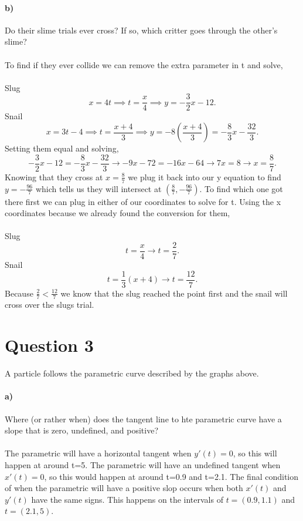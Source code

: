 \documentclass{report}
\begin{document}
\paragraph{b)} Do their slime trials ever cross? If so, which critter goes through the other's slime? \\ \\
To find if they ever collide we can remove the extra parameter in t and solve, \\ \\
Slug
\[
x=4t \implies t= \frac{ x }{ 4 } \implies y=-\frac{ 3 }{ 2 } x-12
.\] 
Snail
\[
x=3t-4 \implies t= \frac{ x+4 }{ 3 } \implies y=-8\left( \frac{ x+4 }{ 3 }  \right) =-\frac{ 8 }{ 3 } x-\frac{ 32 }{ 3 }
.\] 
Setting them equal and solving,
\[
-\frac{ 3 }{ 2 } x-12 = -\frac{ 8 }{ 3 } x-\frac{ 32 }{ 3 } \to -9x -72 =-16x-64 \to 7x=8 \to x=\frac{ 8 }{ 7 } 
.\] 
Knowing that they cross at $ x=\frac{ 8 }{ 7 }  $ we plug it back into our y equation to find $ y=-\frac{ 96 }{ 7 }  $ which tells us they will intersect at $ \left( \frac{ 8 }{ 7 } ,-\frac{ 96 }{ 7 }  \right)  $. To find which one got there first we can plug in either of our coordinates to solve for t. Using the x coordinates because we already found the conversion for them, \\ \\
Slug
\[
t=\frac{ x }{ 4 } \to t=\frac{ 2 }{ 7 } 
.\] 
Snail
\[
t=\frac{ 1 }{ 3 } \left( x+4 \right) \to t=\frac{ 12 }{ 7 } 
.\] 
Because $ \frac{ 2 }{ 7 } < \frac{ 12 }{ 7 }  $ we know that the slug reached the point first and the snail will cross over the slugs trial. 
\section*{Question 3}%
\label{sec:Question 3}
A particle follows the parametric curve described by the graphs above. 
\paragraph{a)} Where (or rather when) does the tangent line to hte parametric curve have a slope that is zero, undefined, and positive? \\ \\
The parametric will have a horizontal tangent when $ y'\left( t \right) = 0 $, so this will happen at around t=5. The parametric will have an undefined tangent when $ x'\left( t \right) =0$, so this would happen at around t=0.9 and t=2.1. The final condition of when the parametric will have a positive slop occurs when both $ x'\left( t \right)  $ and $ y'\left( t \right)  $ have the same signs. This happens on the intervals of $ t=\left( 0.9,1.1 \right)  $ and $ t=\left( 2.1,5 \right)  $.
\end{document}
